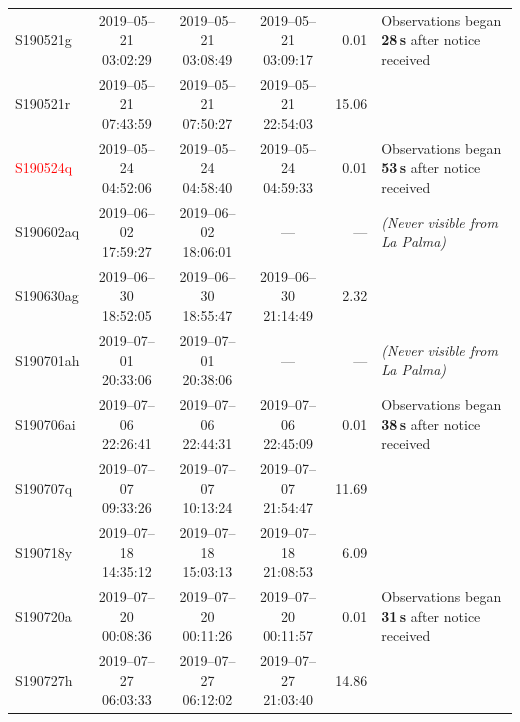 \begin{colsection}
\begin{colsection}
\begin{table}
\begin{footnotesize}
\begin{center}
\begin{tabular}{l|cccrl}
            \\
            S190521g &
            2019--05--21 03:02:29 &
            2019--05--21 03:08:49 &
            2019--05--21 03:09:17 &
            0.01 &
            Observations began \textbf{28\,s} after notice received
            \\
            S190521r &
            2019--05--21 07:43:59 &
            2019--05--21 07:50:27 &
            2019--05--21 22:54:03 &
            15.06 &

            \\
            \textcolor{Red}{S190524q} &
            2019--05--24 04:52:06 &
            2019--05--24 04:58:40 &
            2019--05--24 04:59:33 &
            0.01 &
            Observations began \textbf{53\,s} after notice received
            \\
            S190602aq &
            2019--06--02 17:59:27 &
            2019--06--02 18:06:01 &
            --- &
            --- &
            \textit{(Never visible from La Palma)}
            \\
            S190630ag &
            2019--06--30 18:52:05 &
            2019--06--30 18:55:47 &
            2019--06--30 21:14:49 &
            2.32 &

            \\
            S190701ah &
            2019--07--01 20:33:06 &
            2019--07--01 20:38:06 &
            --- &
            --- &
            \textit{(Never visible from La Palma)}
            \\
            S190706ai &
            2019--07--06 22:26:41 &
            2019--07--06 22:44:31 &
            2019--07--06 22:45:09 &
            0.01 &
            Observations began \textbf{38\,s} after notice received
            \\
            S190707q &
            2019--07--07 09:33:26 &
            2019--07--07 10:13:24 &
            2019--07--07 21:54:47 &
            11.69 &

            \\
            S190718y &
            2019--07--18 14:35:12 &
            2019--07--18 15:03:13 &
            2019--07--18 21:08:53 &
            6.09 &

            \\
            S190720a &
            2019--07--20 00:08:36 &
            2019--07--20 00:11:26 &
            2019--07--20 00:11:57 &
            0.01 &
            Observations began \textbf{31\,s} after notice received
            \\
            S190727h &
            2019--07--27 06:03:33 &
            2019--07--27 06:12:02 &
            2019--07--27 21:03:40 &
            14.86 &


\end{tabular}
\end{center}
\end{footnotesize}
\end{table}
\end{colsection}
\end{colsection}
